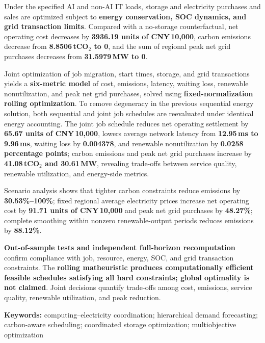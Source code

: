 \documentclass[fontset=windows, scheme=plain, 12pt, a4paper]{ctexart}
\begin{document}
    Under the specified AI and non-AI IT loads, storage and electricity purchases and sales are optimized subject to \textbf{energy conservation, SOC dynamics, and grid transaction limits}.
    Compared with a no-storage counterfactual, net operating cost decreases by \textbf{3936.19 units of CNY\,10,000},
    carbon emissions decrease from \textbf{8.8506\,tCO$_2$ to 0},
    and the sum of regional peak net grid purchases decreases from \textbf{31.5979\,MW to 0}.
	
    Joint optimization of job migration, start times, storage, and grid transactions yields a \textbf{six-metric model} of cost, emissions, latency, waiting loss, renewable nonutilization, and peak net grid purchases, solved using \textbf{fixed-normalization rolling optimization}. To remove degeneracy in the previous sequential energy solution, both sequential and joint job schedules are reevaluated under identical energy accounting. The joint job schedule reduces net operating settlement by \textbf{65.67 units of CNY\,10,000},
    lowers average network latency from \textbf{12.95\,ms to 9.96\,ms}, waiting loss by \textbf{0.004378}, and renewable nonutilization by \textbf{0.0258 percentage points};
    carbon emissions and peak net grid purchases increase by \textbf{41.08\,tCO$_2$ and 30.61\,MW}, revealing trade-offs between service quality, renewable utilization, and energy-side metrics.
	
    Scenario analysis shows that tighter carbon constraints reduce emissions by \textbf{30.53\%--100\%}; fixed regional average electricity prices increase net operating cost by \textbf{91.71 units of CNY\,10,000} and peak net grid purchases by \textbf{48.27\%}; complete smoothing within nonzero renewable-output periods reduces emissions by \textbf{88.12\%}.
	
    \textbf{Out-of-sample tests and independent full-horizon recomputation} confirm compliance with job, resource, energy, SOC, and grid transaction constraints. The \textbf{rolling matheuristic produces computationally efficient feasible schedules satisfying all hard constraints; global optimality is not claimed}.
    Joint decisions quantify trade-offs among cost, emissions, service quality, renewable utilization, and peak reduction.
	
    \noindent\textbf{Keywords:} computing--electricity coordination; hierarchical demand forecasting; carbon-aware scheduling; coordinated storage optimization; multiobjective optimization
	
	
	
\end{document}
